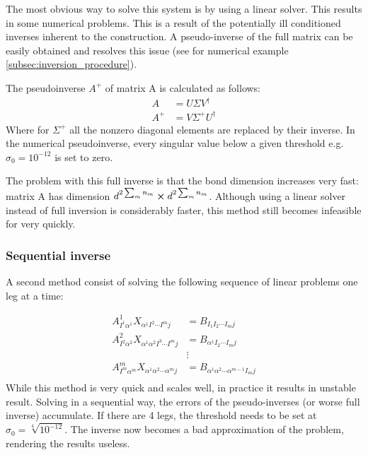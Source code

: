 The most obvious way to solve this system is by using a linear solver. This results in some numerical problems. This is a result of the potentially ill conditioned inverses inherent to the construction. A pseudo-inverse of the full matrix can be easily obtained and resolves this issue (see for numerical example \cref{subsec:inversion_procedure}).

The pseudoinverse $A^{+}$ of matrix A is calculated as follows:
\begin{align}
    A     & = U \Sigma V^{\dagger}     \\
    A^{+} & = V \Sigma^{+} U^{\dagger}
\end{align}
Where for $\Sigma^{+}$ all the nonzero diagonal elements are replaced by their inverse. In the numerical pseudoinverse, every singular value below a given threshold e.g. $\sigma_0 = 10^{-12}$ is set to zero.

The problem with this full inverse is that the bond dimension increases very fast: matrix A has dimension $d^ {2 \sum_m n_m } \cross d^ {2 \sum_m n_m } $. Although using a linear solver instead of full inversion is considerably faster, this method still becomes infeasible for very quickly.

\subsubsection{Sequential inverse}

A second method consist of solving the following sequence of linear problems one leg at a time:

\begin{equation}
    \begin{split}
        A^1_{ I^1 \alpha^1 } X_{ \alpha^1  I^2 \cdots I^m j} &=  B_{  I_1  I_2 \cdots I_m   j }\\
        A^2_{ I^2 \alpha^2 } X_{ \alpha^1   \alpha^2  I^3 \cdots I^m j} &=  B_{  \alpha^1  I_2 \cdots I_m   j }\\
        &\vdots\\
        A^m_{ I^m \alpha^m } X_{ \alpha^1 \alpha^2 \cdots \alpha^m j  } &=  B_{ \alpha^1 \alpha^2 \cdots \alpha^{m-1} I_m   j }\\
    \end{split}
\end{equation}
While this method is very quick and scales well, in practice it results in unstable result. Solving in a sequential way, the errors of the pseudo-inverses (or worse full inverse) accumulate. If there are 4 legs, the threshold needs to be set at $ \sigma_0 = \sqrt[4]{ 10^{-12} } $. The inverse now becomes a bad approximation of the problem, rendering the results useless.


